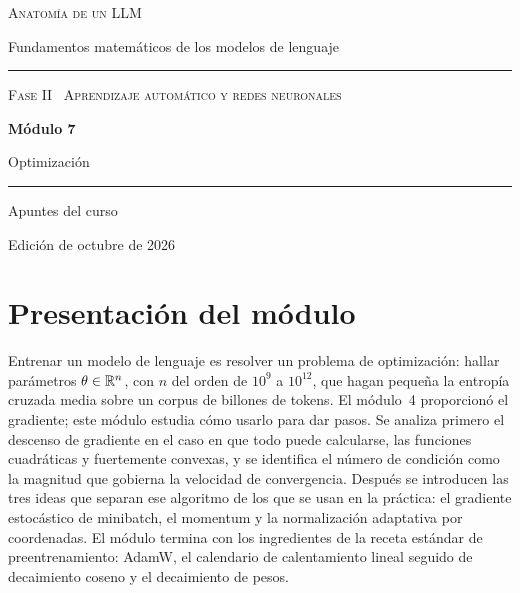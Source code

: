\documentclass[11pt,a4paper,twoside,openany]{book}
\begin{document}
\frontmatter
\begin{titlepage}
\centering
\vspace*{2.5cm}
{\large\scshape Anatomía de un LLM}\par
\vspace{0.4cm}
{\normalsize Fundamentos matemáticos de los modelos de lenguaje}\par
\vspace{2.2cm}
\rule{\textwidth}{0.8pt}\par\vspace{0.5cm}
{\small\scshape Fase II \textperiodcentered\ Aprendizaje automático y redes neuronales}\par\vspace{0.3cm}
{\Huge\bfseries Módulo 7\par}\vspace{0.3cm}
{\LARGE Optimización\par}
\vspace{0.5cm}\rule{\textwidth}{0.4pt}\par
\vspace{1.6cm}
{\large Apuntes del curso}\par
\vfill
{\small Edición de octubre de 2026}\par
\end{titlepage}

\chapter*{Presentación del módulo}

Entrenar un modelo de lenguaje es resolver un problema de optimización: hallar parámetros $\theta\in\mathbb{R}^{n}$, con $n$ del orden de $10^{9}$ a $10^{12}$, que hagan pequeña la entropía cruzada media sobre un corpus de billones de tokens. El módulo~4 proporcionó el gradiente; este módulo estudia cómo usarlo para dar pasos. Se analiza primero el descenso de gradiente en el caso en que todo puede calcularse, las funciones cuadráticas y fuertemente convexas, y se identifica el número de condición como la magnitud que gobierna la velocidad de convergencia. Después se introducen las tres ideas que separan ese algoritmo de los que se usan en la práctica: el gradiente estocástico de minibatch, el momentum y la normalización adaptativa por coordenadas. El módulo termina con los ingredientes de la receta estándar de preentrenamiento: AdamW, el calendario de calentamiento lineal seguido de decaimiento coseno y el decaimiento de pesos.
\end{document}
